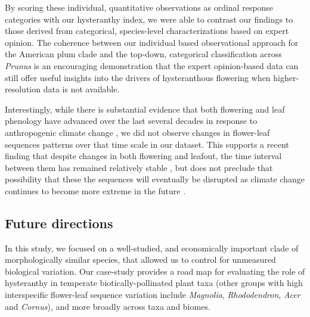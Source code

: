 \documentclass{article}[12pt]
\begin{document}

By scoring these individual, quantitative observations as ordinal response categories with our hysteranthy index, we were able to contrast our findings to those derived from categorical, species-level characterizations based on expert opinion. The coherence between our individual based observational approach for the American plum clade and the top-down, categorical classification across \emph{Prunus} is an encouraging demonstration that the expert opinion-based data can still offer useful insights into the drivers of hysteranthous flowering when higher-resolution data is not available. 

Interestingly, while there is substantial evidence that both flowering and leaf phenology have advanced over the last several decades in response to anthropogenic climate change \citep{Menzel2006,Cleland2007,Augspurger:2020aa}, we did not observe changes in flower-leaf sequences patterns over that time scale in our dataset. This supports a recent finding that despite changes in both flowering and leafout, the time interval between them has remained relatively stable \citep{Guo:2023wb}, but does not preclude that possibility that these the sequences will eventually be disrupted as climate change continues to become more extreme in the future \citep{Buonaiuto_2021}.

\subsection*{Future directions}

In this study, we focused on a well-studied, and economically important clade of morphologically similar species, that allowed us to control for unmeasured biological variation. Our case-study provides a road map for evaluating the role of hysteranthy in temperate biotically-pollinated plant taxa (other groups with high interspecific flower-leaf sequence variation include \emph{Magnolia}, \emph{Rhododendron}, \emph{Acer} and \emph{Cornus}), and more broadly across taxa and biomes.
\end{document}
